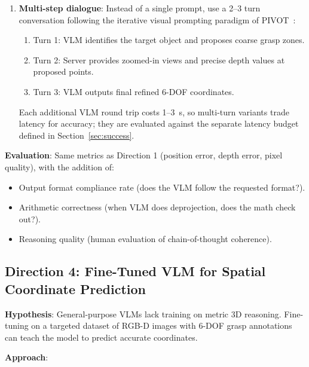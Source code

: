 \documentclass[11pt,a4paper]{article}
\begin{document}
\begin{enumerate}[label=\textbf{P\arabic*:}, leftmargin=*]
    \item \textbf{Multi-step dialogue}: Instead of a single prompt, use a 2--3 turn conversation following the iterative visual prompting paradigm of PIVOT~\cite{nasiriany2024pivot}:
    \begin{enumerate}[nosep]
        \item Turn 1: VLM identifies the target object and proposes coarse grasp zones.
        \item Turn 2: Server provides zoomed-in views and precise depth values at proposed points.
        \item Turn 3: VLM outputs final refined 6-DOF coordinates.
    \end{enumerate}
    Each additional VLM round trip costs 1--3~s, so multi-turn variants trade latency for accuracy; they are evaluated against the separate latency budget defined in Section~\ref{sec:success}.
\end{enumerate}

\textbf{Evaluation}: Same metrics as Direction 1 (position error, depth error, pixel quality), with the addition of:
\begin{itemize}[nosep]
    \item Output format compliance rate (does the VLM follow the requested format?).
    \item Arithmetic correctness (when VLM does deprojection, does the math check out?).
    \item Reasoning quality (human evaluation of chain-of-thought coherence).
\end{itemize}

\subsection{Direction 4: Fine-Tuned VLM for Spatial Coordinate Prediction}

\textbf{Hypothesis}: General-purpose VLMs lack training on metric 3D reasoning. Fine-tuning on a targeted dataset of RGB-D images with 6-DOF grasp annotations can teach the model to predict accurate coordinates.

\textbf{Approach}:
\end{document}
